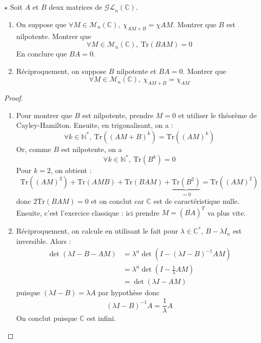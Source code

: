 \documentclass[french,a4paper]{article}
\newcommand{\N}{\mathbb{N}}
\newcommand{\C}{\mathbb{C}}
\newcommand{\st}{^*}
\newcommand{\inv}{^{-1}}
\newcommand{\Tr}{\text{Tr}}
\theoremstyle{plain}
\theoremstyle{definition}
\theoremstyle{remark}
\begin{document}
\begin{ex}{$\star$}
	Soit $A$ et $B$ deux matrices de $\mathcal{GL}_n(\C)$.
	\begin{enumerate}
		\item On suppose que $\forall M\in\mathcal{M}_n(\C),\ \chi_{AM+B}=\chi{AM}$. Montrer que $B$ est nilpotente. Montrer que $$\forall M\in\mathcal{M}_n(\C),\ \Tr(BAM)=0$$ En conclure que $BA=0$.
		\item Réciproquement, on suppose $B$ nilpotente et $BA=0$. Montrer que $$\forall M\in\mathcal{M}_n(\C),\ \chi_{AM+B}=\chi_{AM}$$
	\end{enumerate}
\end{ex}
\begin{proof}
	\begin{enumerate}
		\item Pour montrer que $B$ est nilpotente, prendre $M=0$ et utiliser le théorème de Cayley-Hamilton. Ensuite, en trigonalisant, on a : $$\forall k\in\N\st, \ \Tr((AM+B)^k)=\Tr((AM)^k)$$ Or, comme $B$ est nilpotente, on a $$\forall k\in\N\st,\ \Tr(B^k)=0$$ Pour $k=2$, on obtient : $$\Tr((AM)^2)+\Tr(AMB)+\Tr(BAM)+\underbrace{\Tr(B^2)}_{=0}=\Tr((AM)^2)$$ donc $2\Tr(BAM)=0$ et on conclut car $\C$ est de caractéristique nulle. Ensuite, c'est l'exercice classique : ici prendre $M=(\overline{BA})^T$ va plus vite.
		\item Réciproquement, on calcule en utilisant le fait pour $\lambda\in\C\st$, $B-\lambda I_n$ est inversible. Alors : \begin{align*}
			\det(\lambda I-B-AM)&=\lambda^n\det(I-(\lambda I-B)\inv AM) \\
			&=\lambda^n\det\left(I-\frac{1}{\lambda}AM\right)\\
			&=\det(\lambda I-AM)
		\end{align*} puisque $(\lambda I-B)=\lambda A$ par hypothèse donc $$(\lambda I-B)\inv A=\frac{1}{\lambda}A$$ On conclut puisque $\C$ est infini.
	\end{enumerate}
\end{proof}
\end{document}
